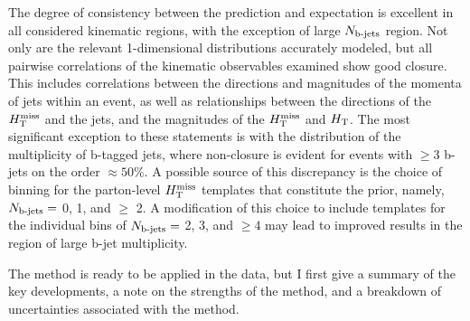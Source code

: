 \FloatBarrier
\noindent
The degree of consistency between the prediction and expectation is excellent in all considered kinematic regions, with the exception of large $N_{\text{b-jets}}$ region. Not only are the relevant 1-dimensional distributions accurately modeled, but all pairwise correlations of the kinematic observables examined show good closure. This includes correlations between the directions and magnitudes of the momenta of jets within an event, as well as relationships between the directions of the $H_{\text{T}}^{\rm miss}$ and the jets, and the magnitudes of the $H_{\text{T}}^{\rm miss}$ and $H_{\rm T}$. The most significant exception to these statements is with the distribution of the multiplicity of b-tagged jets,  where non-closure is evident for events with $\geq 3$ b-jets on the order $\approx50\%$. A possible source of this discrepancy is the choice of binning for the parton-level $H_{\text{T}}^{\rm miss}$ templates that constitute the prior, namely, $N_{\text{b-jets}}=$ 0, 1, and $\geq$ 2.  A modification of this choice to include templates for the individual bins of $N_{\text{b-jets}}=$ 2, 3, and $\geq 4$ may lead to improved results in the region of large b-jet multiplicity. 

The method is ready to be applied in the data, but I first give a summary of the key developments, a note on the strengths of the method, and a breakdown of uncertainties associated with the method.

